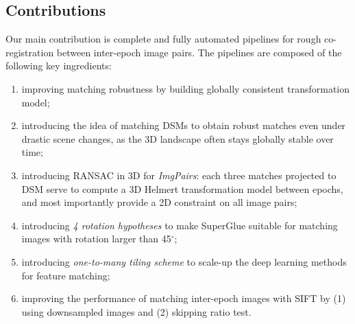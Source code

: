 \subsection{Contributions}
Our main contribution is complete and fully automated pipelines for rough co-registration between inter-epoch image pairs. The pipelines are composed of the following key ingredients:
\begin{enumerate}
	\item improving matching robustness by building globally consistent transformation model;%
	\item introducing the idea of matching \ac{DSM}s to obtain robust matches even under drastic scene changes, as the 3D landscape often stays globally stable over time;
	\item introducing RANSAC in 3D for \textit{ImgPairs}: each three matches projected to \ac{DSM} serve to compute a 3D Helmert transformation model between epochs, and most importantly provide a 2D constraint on all image pairs;
	\item introducing \textit{4 rotation hypotheses} to make SuperGlue suitable for matching images with rotation larger than 45$^\circ$;
	\item introducing \textit{one-to-many tiling scheme} to scale-up the deep learning methods for feature matching;
	\item improving the performance of matching inter-epoch images with SIFT by (1) using downsampled images and (2) skipping ratio test.%
\end{enumerate}



